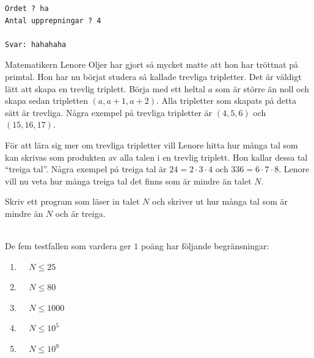 \vspace{1cm}
\begin{verbatim}
Ordet ? ha
Antal upprepningar ? 4 
  
Svar: hahahaha
\end{verbatim}



\newpage
{}



\vspace{1cm}

Matematikern Lenore Oljer har gjort så mycket matte att hon har tröttnat på primtal. 
Hon har nu börjat studera så kallade trevliga tripletter. 
Det är väldigt lätt att skapa en trevlig triplett. 
Börja med ett heltal $a$ som är
större än noll och skapa sedan tripletten $(a,a+1,a+2)$. 
Alla tripletter som skapats på detta sätt är trevliga. 
Några exempel på trevliga tripletter är $(4,5,6)$ och $(15,16,17)$.

För att lära sig mer om trevliga tripletter vill Lenore hitta hur 
många tal som kan skrivas som produkten av
alla talen i en trevlig triplett. Hon kallar dessa tal ``treiga tal''. 
Några exempel på treiga tal är $24=2 \cdot 3 \cdot 4$
och $336 = 6 \cdot 7 \cdot 8$. Lenore vill nu veta hur många treiga tal det 
finns som är mindre än talet $N$.

Skriv ett program som läser in talet $N$ och skriver ut hur många tal som är mindre än
$N$ och är treiga.

\\
De fem testfallen som vardera ger $1$ poäng har följande begränsningar:
\begin{enumerate}
\item  $\;\;\;\;N \le 25 $    
\item  $\;\;\;\;N \le 80 $ 
\item  $\;\;\;\;N \le 1000 $   
\item  $\;\;\;\;N \le 10^5 $   
\item  $\;\;\;\;N \le 10^9 $   
\end{enumerate}


\vspace{1cm}

